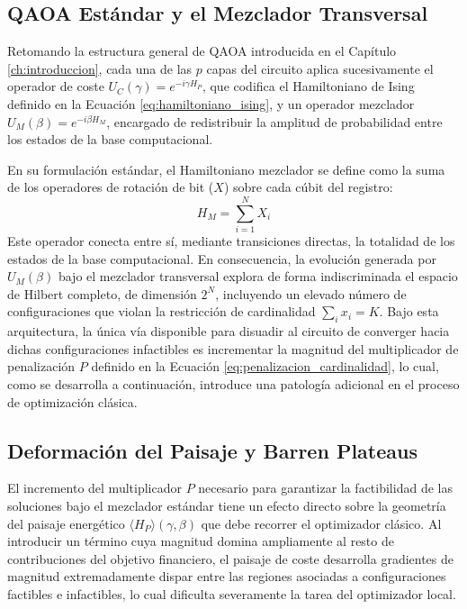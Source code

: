 \subsection{QAOA Estándar y el Mezclador Transversal}
\label{subsec:qaoa_estandar}

Retomando la estructura general de QAOA introducida en el Capítulo
\ref{ch:introduccion}, cada una de las $p$ capas del circuito aplica
sucesivamente el operador de coste $U_C(\gamma) = e^{-i\gamma H_P}$,
que codifica el Hamiltoniano de Ising definido en la Ecuación
\eqref{eq:hamiltoniano_ising}, y un operador mezclador
$U_M(\beta) = e^{-i\beta H_M}$, encargado de redistribuir la amplitud de
probabilidad entre los estados de la base computacional.

En su formulación estándar, el Hamiltoniano mezclador se define como la suma de los operadores de rotación de bit ($X$) sobre cada cúbit del registro:
\begin{equation}
    H_M = \sum_{i=1}^N X_i
    \label{eq:mezclador_x}
\end{equation}
Este operador conecta entre sí, mediante transiciones directas, la totalidad de los estados de la base computacional. En consecuencia, la evolución generada por $U_M(\beta)$ bajo el mezclador transversal explora de forma indiscriminada el espacio de Hilbert completo, de dimensión $2^N$, incluyendo un elevado número de configuraciones que violan la restricción de cardinalidad $\sum_i x_i = K$. Bajo esta arquitectura, la única vía disponible para disuadir al circuito de converger hacia dichas configuraciones infactibles es incrementar la magnitud del multiplicador de penalización $P$ definido en la Ecuación \eqref{eq:penalizacion_cardinalidad}, lo cual, como se desarrolla a continuación, introduce una patología adicional en el proceso de optimización clásica.

\subsection{Deformación del Paisaje y Barren Plateaus}
\label{subsec:barren_plateaus}

El incremento del multiplicador $P$ necesario para garantizar la factibilidad de las soluciones bajo el mezclador estándar tiene un efecto directo sobre la geometría del paisaje energético $\langle H_P \rangle (\gamma, \beta)$ que debe recorrer el optimizador clásico. Al introducir un término cuya magnitud domina ampliamente al resto de contribuciones del objetivo financiero, el paisaje de coste desarrolla gradientes de magnitud extremadamente dispar entre las regiones asociadas a configuraciones factibles e infactibles, lo cual dificulta severamente la tarea del optimizador local.

